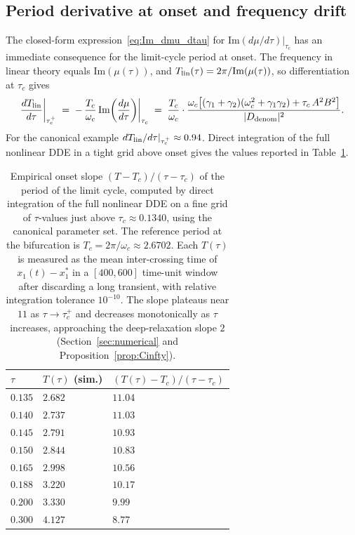 \documentclass[sn-mathphys,Numbered]{sn-jnl}
\theoremstyle{thmstyleone}
\theoremstyle{thmstyletwo}
\theoremstyle{thmstylethree}
\begin{document}
\subsection{Period derivative at onset and frequency drift}
\label{sec:period_onset}

The closed-form expression~\eqref{eq:Im_dmu_dtau} for
$\mathrm{Im}(d\mu/d\tau)|_{\tau_c}$ has an immediate consequence for the
limit-cycle period at onset. The frequency in linear theory equals
$\mathrm{Im}(\mu(\tau))$, and $T_{\rm lin}(\tau)=2\pi/\mathrm{Im}(\mu(\tau))$,
so differentiation at $\tau_c$ gives
\begin{equation}
\frac{dT_{\rm lin}}{d\tau}\bigg|_{\tau_c^{+}}
\;=\; -\,\frac{T_c}{\omega_c}\,
\mathrm{Im}\!\left(\frac{d\mu}{d\tau}\right)\!\bigg|_{\tau_c}
\;=\;
\frac{T_c}{\omega_c}\cdot
\frac{\omega_c\bigl[(\gamma_1+\gamma_2)(\omega_c^2+\gamma_1\gamma_2)
                       +\tau_c\,A^2B^2\bigr]}
     {|D_{\rm denom}|^2}.
\label{eq:dT_dtau_linear}
\end{equation}
For the canonical example
$dT_{\rm lin}/d\tau|_{\tau_c^+}\approx 0.94$. Direct integration of the
full nonlinear DDE in a tight grid above onset gives the values reported
in Table~\ref{tab:onset_period}.

\begin{table}[ht]
\centering
\begin{tabular}{lll}
\toprule
$\tau$ & $T(\tau)$ (sim.) & $(T(\tau)-T_c)/(\tau-\tau_c)$\\
\midrule
$0.135$ & $2.682$ & $11.04$\\
$0.140$ & $2.737$ & $11.03$\\
$0.145$ & $2.791$ & $10.93$\\
$0.150$ & $2.844$ & $10.83$\\
$0.165$ & $2.998$ & $10.56$\\
$0.188$ & $3.220$ & $10.17$\\
$0.200$ & $3.330$ & $9.99$\\
$0.300$ & $4.127$ & $8.77$\\
\bottomrule
\end{tabular}
\caption{Empirical onset slope $(T-T_c)/(\tau-\tau_c)$ of the period of
the limit cycle, computed by direct integration of the full nonlinear
DDE on a fine grid of $\tau$-values just above $\tau_c\approx 0.1340$,
using the canonical parameter set. The reference period at the
bifurcation is $T_c=2\pi/\omega_c\approx 2.6702$. Each $T(\tau)$ is
measured as the mean inter-crossing time of $x_1(t)-x_1^*$ in a
$[400,600]$ time-unit window after discarding a long transient, with
relative integration tolerance $10^{-10}$. The slope plateaus near $11$
as $\tau\to\tau_c^+$ and decreases monotonically as $\tau$ increases,
approaching the deep-relaxation slope $2$ (Section~\ref{sec:numerical}
and Proposition~\ref{prop:Cinfty}).}
\label{tab:onset_period}
\end{table}
\end{document}
